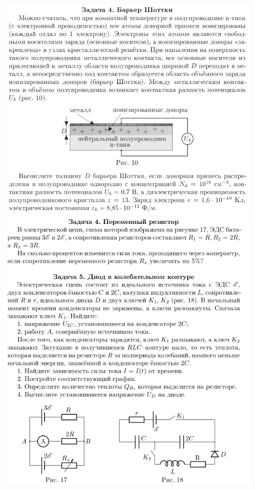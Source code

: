 \begin{center}
  \includegraphics[width=14cm]{reg20134}
  \includegraphics[width=14cm]{reg20111}
\end{center}





